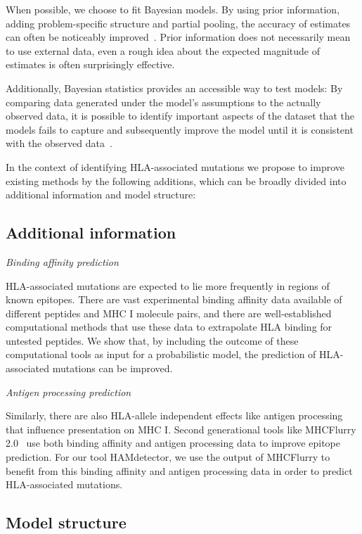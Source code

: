 \documentclass[fleqn,11pt]{SelfArx} %
\begin{document}
When possible, we choose to fit Bayesian models. By using prior information, adding problem-specific structure and partial pooling, the accuracy of estimates can often be noticeably improved~\cite{Gelman2010}. Prior information does not necessarily mean to use external data, even a rough idea about the expected magnitude of estimates is often surprisingly effective.

Additionally, Bayesian statistics provides an accessible way to test models: By comparing data generated under the model's assumptions to the actually observed data, it is possible to identify important aspects of the dataset that the models fails to capture and subsequently improve the model until it is consistent with the observed data~\cite{Gabry2019}.

In the context of identifying HLA-associated mutations we propose to improve existing methods by the following additions, which can be broadly divided into  additional information and model structure:
\subsection*{Additional information}

  \textit{Binding affinity prediction}

    HLA-associated mutations are expected to lie more frequently in regions of known epitopes. There are vast experimental binding affinity data available of different peptides and MHC I molecule pairs, and there are well-established computational methods that use these data to extrapolate HLA binding for untested peptides. We show that, by including the outcome of these computational tools as input for a probabilistic model, the prediction of HLA-associated mutations can be improved.

  \textit{Antigen processing prediction}
  
    Similarly, there are also HLA-allele independent effects like antigen processing that influence presentation on MHC I. Second generational tools like MHCFlurry 2.0~\cite{ODonnell2020} use both binding affinity and antigen processing data to improve epitope prediction. For our tool HAMdetector, we use the output of MHCFlurry to benefit from this binding affinity and antigen processing data in order to predict HLA-associated mutations.

\subsection*{Model structure}
\end{document}
